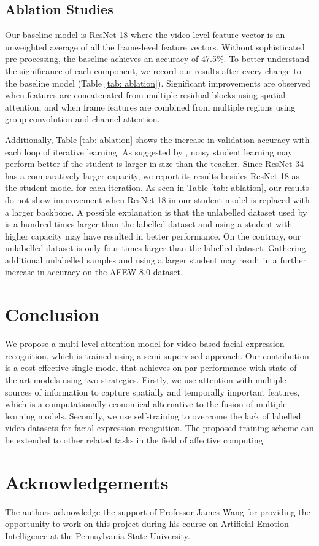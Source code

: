 \documentclass[runningheads]{llncs}
\begin{document}
\subsection{Ablation Studies} \label{sec: ablation}
Our baseline model is ResNet-18 where the video-level feature vector is an unweighted average of all the frame-level feature vectors. Without sophisticated pre-processing, the baseline achieves an accuracy of 47.5\%. To better understand the significance of each component, we record our results after every change to the baseline model (Table \ref{tab: ablation}). Significant improvements are observed when features are concatenated from multiple residual blocks using spatial-attention, and when frame features are combined from multiple regions using group convolution and channel-attention.

Additionally, Table \ref{tab: ablation} shows the increase in validation accuracy with each loop of iterative learning. As suggested by \cite{xie2019self}, noisy student learning may perform better if the student is larger in size than the teacher.  Since ResNet-34 \cite{he2016deep} has a comparatively larger capacity, we report its results besides ResNet-18 as the student model for each iteration. As seen in Table \ref{tab: ablation}, our results do not show improvement when ResNet-18 in our student model is replaced with a larger backbone. A possible explanation is that the unlabelled dataset used by \cite{xie2019self} is a hundred times larger than the labelled dataset and using a student with higher capacity may have resulted in better performance. On the contrary, our unlabelled dataset is only four times larger than the labelled dataset. Gathering additional unlabelled samples and using a larger student may result in a further increase in accuracy on the AFEW 8.0 dataset.

\section{Conclusion}
We propose a multi-level attention model for video-based facial expression recognition, which is trained using a semi-supervised approach. Our contribution is a cost-effective single model that achieves on par performance with state-of-the-art models using two strategies. Firstly, we use attention with multiple sources of information to capture spatially and temporally important features, which is a computationally economical alternative to the fusion of multiple learning models. Secondly, we use self-training to overcome the lack of labelled video datasets for facial expression recognition. The proposed training scheme can be extended to other related tasks in the field of affective computing.

\section{Acknowledgements}
The authors acknowledge the support of Professor James Wang for providing the opportunity to work on this project during his course on Artificial Emotion Intelligence at the Pennsylvania State University.



\end{document}
